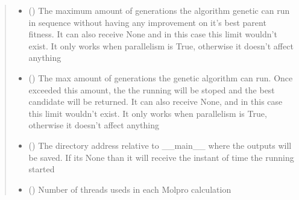 \documentclass[letterpaper,10pt,english]{sphinxmanual}
\begin{document}
\begin{fulllineitems}
\begin{quote}
\begin{description}
\begin{itemize}
\item {} 
\sphinxAtStartPar
{} (\sphinxstyleliteralemphasis{\sphinxupquote{{[}}}\sphinxstyleliteralemphasis{\sphinxupquote{, }}\sphinxstyleliteralemphasis{\sphinxupquote{{]}}}) \textendash{} The maximum amount of generations the algorithm genetic can run in sequence without having
any improvement on it’s best parent fitness. It can also receive None and in this case this limit wouldn’t
exist. It only works when parallelism is True, otherwise it doesn’t affect anything

\item {} 
\sphinxAtStartPar
{} (\sphinxstyleliteralemphasis{\sphinxupquote{{[}}}\sphinxstyleliteralemphasis{\sphinxupquote{, }}\sphinxstyleliteralemphasis{\sphinxupquote{{]}}}) \textendash{} The max amount of generations the genetic algorithm can run. Once exceeded this amount, the
the running will be stoped and the best candidate will be returned. It can also receive None, and in this
case this limit wouldn’t exist. It only works when parallelism is True, otherwise it doesn’t affect anything

\item {} 
\sphinxAtStartPar
{} () \textendash{} The directory address relative to \_\_main\_\_ where the outputs will be saved. If its None
than it will receive the instant of time the running started

\item {} 
\sphinxAtStartPar
{} () \textendash{} Number of threads useds in each Molpro calculation

\end{itemize}

\end{description}\end{quote}


\end{fulllineitems}
\end{document}
